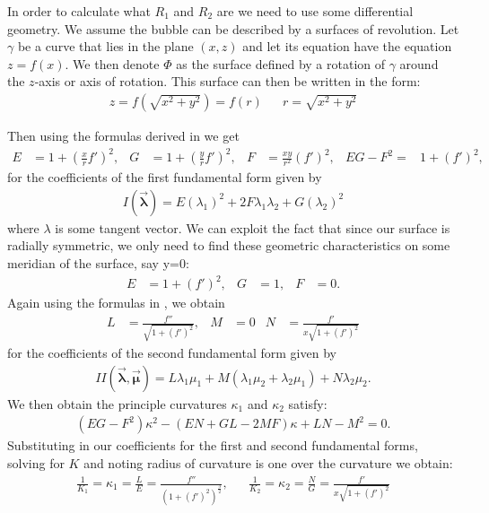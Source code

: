 In order to calculate what $R_1$ and $R_2$ are we need to use some differential geometry. We assume the bubble can be described by a surfaces of revolution.
Let $\gamma$ be a curve that lies in the plane $(x,z)$ and let its equation have the equation $z=f(x)$. We then denote $\Phi$ as the surface defined by a rotation of $\gamma$ around the $z$-axis or axis of rotation. This surface can then be written in the form:
\begin{align}
    z=f(\sqrt{x^2+y^2})=f(r) && r=\sqrt{x^2+y^2}
\end{align}

Then using the formulas derived in \cite{toponogov2006differential} we get
\begin{align}
    E&=1+(\frac{x}{r}f')^2,&G&=1+(\frac{y}{r}f')^2, &F&=\frac{xy}{r^2}(f')^2, &EG-F^2=&1+(f')^2,
\end{align}
for the coefficients of the first fundamental form given by
\begin{align}
    I( \vec{ \boldsymbol\lambda}) = E(\lambda_1)^2 +2F\lambda_1 \lambda_2 + G(\lambda_2)^2
\end{align}
where $\lambda$ is some tangent vector. We can exploit the fact that since our surface is radially symmetric, we only need to find these geometric characteristics on some meridian of the surface, say y=0:
\begin{align}
    E&=1+(f')^2,& G&=1, &F&=0.
\end{align}
Again using the formulas in \cite{toponogov2006differential}, we obtain
\begin{align}
    L&=\frac{f''}{\sqrt{1+(f')^2}},&M&=0&  N&=\frac{f'}{x\sqrt{1+(f')^2}}
\end{align}
for the coefficients of the second fundamental form given by
\begin{align}
    II( \vec{ \boldsymbol\lambda},\vec{ \boldsymbol\mu}) = L\lambda_1 \mu_1 +M(\lambda_1\mu_2 + \lambda_2 \mu_1)  + N\lambda_2 \mu_2.
\end{align}
We then obtain the principle curvatures $\kappa_1$ and $\kappa_2$ satisfy:
\begin{align}
    (EG-F^2)\kappa^2 - (EN+GL -2MF)\kappa +LN-M^2 = 0.
\end{align}
Substituting in our coefficients for the first and second fundamental forms, solving for $K$ and noting radius of curvature is one over the curvature we obtain:
\begin{align}
    \frac{1}{K_1} =\kappa_1= \frac{L}{E}=\frac{f''}{(1+(f')^2)^{\frac{3}{2}}}, && \frac{1}{K_2} = \kappa_2 = \frac{N}{G} = \frac{f'}{x \sqrt{1+(f')^2}}
\end{align}
